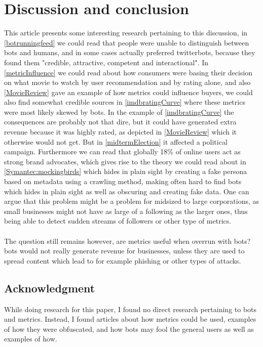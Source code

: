 \section{Discussion and conclusion}
This article presents some interesting research pertaining to this discussion, in \ref{botrunningfeed} we could read that people were unable to distinguish between bots and humans, and in some cases actually preferred twitterbots, because they found them "credible, attractive, competent and interactional"\cite{Edwards2014372}. In \ref{metricInfluence} we could read about how consumers were basing their decision on what movie to watch by user recommendation and by rating alone, and also \ref{MovieReview} gave an example of how metrics could influence buyers, we could also find somewhat credible sources in \ref{imdbratingCurve} where these metrics were most likely skewed by bots. In the example of \ref{imdbratingCurve} the consequences are probably not that dire, but it could have generated extra revenue because it was highly rated, as depicted in \ref{MovieReview} which it otherwise would not get. But in \ref{midtermElection} it affected a political campaign. Furthermore we can read that globally 18\% of online users act as strong brand advocates, which gives rise to the theory we could read about in \ref{Symantec:mockingbirds} which hides in plain sight by creating a fake persona based on  metadata using a crawling method, making often hard to find bots which hides in plain sight as well as obscuring and creating fake data. One can argue that this problem might be a problem for midsized to large corporations, as small businesses might not have as large of a following as the larger ones, thus being able to detect sudden streams of followers or other type of metrics.
\\
\\
The question still remains however, are metrics useful when overrun with bots? bots would not really generate revenue for businesses, unless they are used to spread content which lead to for example phishing or other types of attacks. 







\subsection*{Acknowledgment}
While doing research for this paper, I found no direct research pertaining to bots and metrics. Instead, I found articles about how metrics could be used, examples of how they were obfuscated, and how bots may fool the general users as well as examples of how. 







